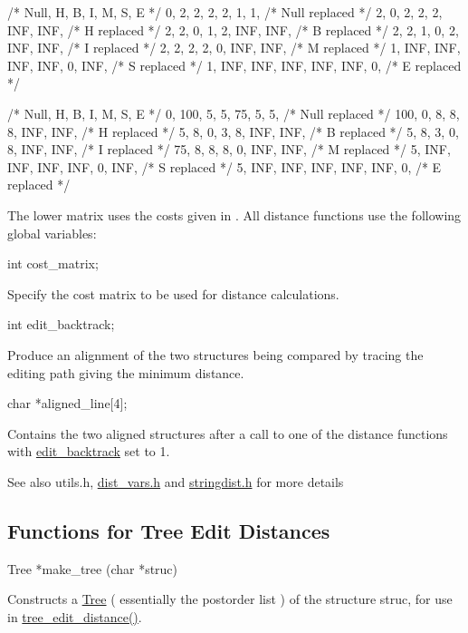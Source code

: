 \begin{DoxyVerb}/*  Null,   H,   B,   I,   M,   S,   E    */
   {   0,   2,   2,   2,   2,   1,   1},   /* Null replaced */
   {   2,   0,   2,   2,   2, INF, INF},   /* H    replaced */
   {   2,   2,   0,   1,   2, INF, INF},   /* B    replaced */
   {   2,   2,   1,   0,   2, INF, INF},   /* I    replaced */
   {   2,   2,   2,   2,   0, INF, INF},   /* M    replaced */
   {   1, INF, INF, INF, INF,   0, INF},   /* S    replaced */
   {   1, INF, INF, INF, INF, INF,   0},   /* E    replaced */


/* Null,   H,   B,   I,   M,   S,   E   */
   {   0, 100,   5,   5,  75,   5,   5},   /* Null replaced */
   { 100,   0,   8,   8,   8, INF, INF},   /* H    replaced */
   {   5,   8,   0,   3,   8, INF, INF},   /* B    replaced */
   {   5,   8,   3,   0,   8, INF, INF},   /* I    replaced */
   {  75,   8,   8,   8,   0, INF, INF},   /* M    replaced */
   {   5, INF, INF, INF, INF,   0, INF},   /* S    replaced */
   {   5, INF, INF, INF, INF, INF,   0},   /* E    replaced */
\end{DoxyVerb}


The lower matrix uses the costs given in \cite{shapiro:1990}. All distance functions use the following global variables\+:

\begin{DoxyVerb}int  cost_matrix;
\end{DoxyVerb}
 Specify the cost matrix to be used for distance calculations.

\begin{DoxyVerb}int   edit_backtrack;
\end{DoxyVerb}
 Produce an alignment of the two structures being compared by tracing the editing path giving the minimum distance.

\begin{DoxyVerb}char *aligned_line[4];
\end{DoxyVerb}
 Contains the two aligned structures after a call to one of the distance functions with \hyperlink{dist__vars_8h_aa03194c513af6b860e7b33e370b82bdb}{edit\+\_\+backtrack} set to 1.

\begin{DoxySeeAlso}{See also}
utils.\+h, \hyperlink{dist__vars_8h}{dist\+\_\+vars.\+h} and \hyperlink{stringdist_8h}{stringdist.\+h} for more details
\end{DoxySeeAlso}
\hypertarget{distance_measures_sec_tree_edit_distance}{}\subsection{Functions for Tree Edit Distances}\label{distance_measures_sec_tree_edit_distance}
\begin{DoxyVerb}Tree   *make_tree (char *struc)
\end{DoxyVerb}
 Constructs a \hyperlink{structTree}{Tree} ( essentially the postorder list ) of the structure \textquotesingle{}struc\textquotesingle{}, for use in \hyperlink{treedist_8h_a3b21f1925f7071f46d93431a835217bb}{tree\+\_\+edit\+\_\+distance()}.

